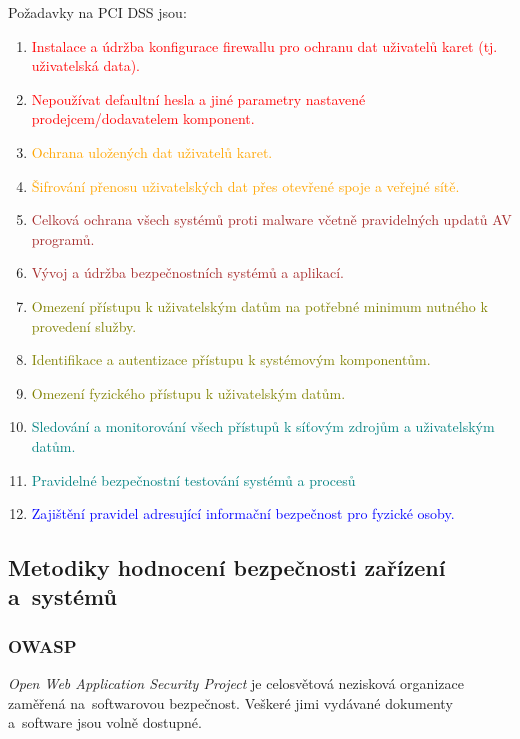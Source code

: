 Požadavky na PCI DSS jsou:
\vspace*{-0.5em}\begin{enumerate}
\item \textcolor{red}{Instalace a údržba konfigurace firewallu pro ochranu dat uživatelů karet (tj. uživatelská data).}
\item \textcolor{red}{Nepoužívat defaultní hesla a jiné parametry nastavené prodejcem/dodavatelem komponent.}
\item \textcolor{orange}{Ochrana uložených dat uživatelů karet.}
\item \textcolor{orange}{Šifrování přenosu uživatelských dat přes otevřené spoje a veřejné sítě.}
\item \textcolor{brown}{Celková ochrana všech systémů proti malware včetně pravidelných updatů AV programů.}
\item \textcolor{brown}{Vývoj a údržba bezpečnostních systémů a aplikací.}
\item \textcolor{olive}{Omezení přístupu k uživatelským datům na potřebné minimum nutného k provedení služby.}
\item \textcolor{olive}{Identifikace a autentizace přístupu k systémovým komponentům.}
\item \textcolor{olive}{Omezení fyzického přístupu k uživatelským datům.}
\item \textcolor{teal}{Sledování a monitorování všech přístupů k síťovým zdrojům a uživatelským datům.}
\item \textcolor{teal}{Pravidelné bezpečnostní testování systémů a procesů}
\item \textcolor{blue}{Zajištění pravidel adresující informační bezpečnost pro fyzické osoby.}
\end{enumerate}


\subsection{Metodiky hodnocení bezpečnosti zařízení a~systémů}

\subsubsection{OWASP}

\emph{Open Web Application Security Project} je celosvětová nezisková organizace zaměřená na~softwarovou bezpečnost.
Veškeré jimi vydávané dokumenty a~software jsou volně dostupné.

